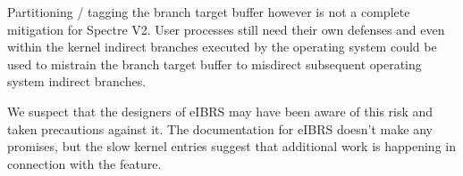 Partitioning / tagging the branch target buffer however is not a complete mitigation for Spectre V2.
User processes still need their own defenses and even within the kernel indirect branches executed by the operating system could be used to mistrain the branch target buffer to misdirect subsequent operating system indirect branches.

We suspect that the designers of eIBRS may have been aware of this risk and taken precautions against it.
The documentation for eIBRS doesn't make any promises, but the slow kernel entries suggest that additional work is happening in connection with the feature.
